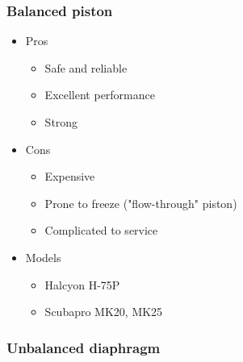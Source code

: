 \documentclass[aspectratio=1610,english,12pt]{beamer}
\begin{document}
\subsubsection{Balanced piston}
\begin{frame}{\insertsubsection}
\end{frame}

\begin{frame}{\insertsubsubsection}
\end{frame}

\begin{frame}{\insertsubsubsection}
\end{frame}

\begin{frame}{\insertsubsubsection}
	\begin{itemize}
		\item Pros
		\begin{itemize}
			\item Safe and reliable
			\item Excellent performance
			\item Strong
		\end{itemize}
		\item Cons
		\begin{itemize}
			\item Expensive
			\item Prone to freeze ("flow-through" piston)
			\item Complicated to service
		\end{itemize}
	\end{itemize}
\end{frame}

\begin{frame}{\insertsubsubsection}
	\begin{itemize}
		\item Models
		\begin{itemize}
			\item Halcyon H-75P
			\item Scubapro MK20, MK25
		\end{itemize}
	\end{itemize}
\end{frame}

\subsubsection{Unbalanced diaphragm}
\begin{frame}{\insertsubsubsection}
\end{frame}
\end{document}
